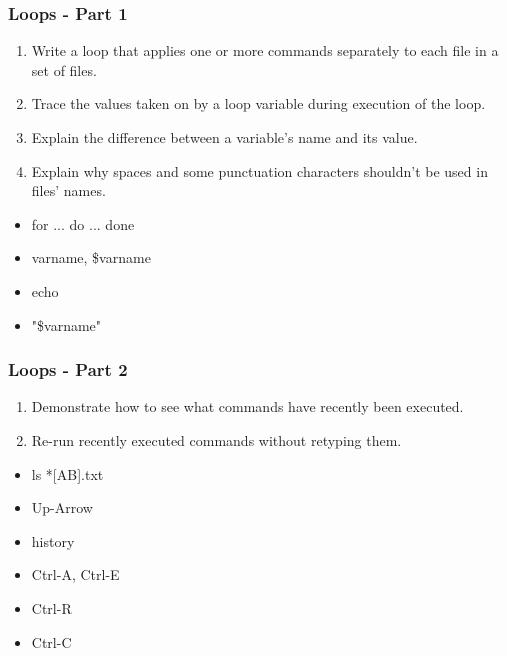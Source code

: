 \documentclass[xcolor=dvipsnames]{beamer}
\begin{document}


\begin{frame}
\frametitle{Loops - Part 1}
\begin{enumerate}
  \item Write a loop that applies one or more commands separately to each file in a set of files.
  \item Trace the values taken on by a loop variable during execution of the loop.
  \item Explain the difference between a variable's name and its value.
  \item Explain why spaces and some punctuation characters shouldn't be used in files' names.
\end{enumerate}
\begin{multicols}{2}
\begin{itemize}
  \item for ... do ... done
  \item varname, \$varname
  \item echo
  \item "\$varname"
\end{itemize}
\end{multicols}
\end{frame}


\begin{frame}
\frametitle{Loops - Part 2}
\begin{enumerate}
  \item Demonstrate how to see what commands have recently been executed.
  \item Re-run recently executed commands without retyping them.
\end{enumerate}
\begin{multicols}{2}
\begin{itemize}
  \item ls *[AB].txt
  \item Up-Arrow
  \item history
  \item Ctrl-A, Ctrl-E
  \item Ctrl-R
  \item Ctrl-C
\end{itemize}
\end{multicols}
\end{frame}
\end{document}
